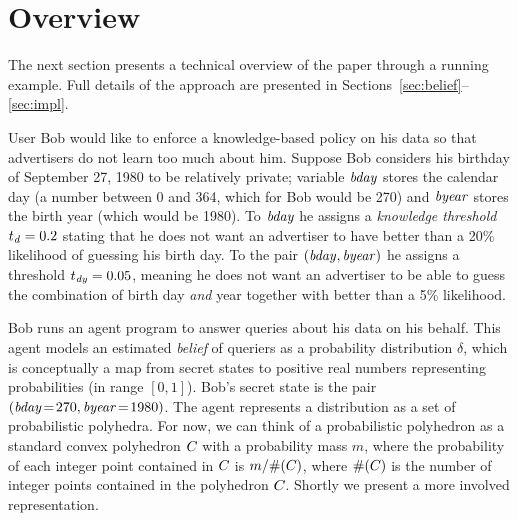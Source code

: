 \section{Overview}
\label{sec:overview}

The next section presents a technical overview of the paper through a
running example.  Full details of the approach are presented in
Sections~\ref{sec:belief}--\ref{sec:impl}. 

  User Bob would
like to enforce a knowledge-based policy on his data so that
advertisers do not learn too much about him.  Suppose Bob considers
his birthday of September 27, 1980 to be relatively private; variable
$\mathit{bday}$ stores the calendar day (a number between 0 and 364,
which for Bob would be 270) and
$\mathit{byear}$ stores the birth year (which would be 1980).  To
$\mathit{bday}$ he assigns a \emph{knowledge threshold} $t_{\mathit{d}} =
0.2$ stating that he does not want an advertiser to have better than a
20\% likelihood of guessing his birth day.  To the pair
$(\mathit{bday},\mathit{byear})$ he assigns a threshold $t_{\mathit{dy}} =
0.05$, meaning he does not want an advertiser to be able to guess the
combination of birth day \emph{and} year together with better than a
5\% likelihood.

Bob runs an agent program to answer queries about his data on his
behalf.  This agent models an estimated \emph{belief} of queriers as a
probability distribution $\delta$, which is conceptually a map from
secret states to positive real numbers representing probabilities (in
range $[0,1]$).  Bob's secret state is the pair $(\mathit{bday}\! =\!
270,\mathit{byear}\! =\! 1980)$.  The agent represents a distribution as a
set of probabilistic polyhedra.  For now, we can think of a
probabilistic polyhedron as a standard convex polyhedron $C_{}$
with a probability mass $m$, where the probability of each integer
point contained in $C_{}$ is $m / \#(C_{})$, where
$\#(C_{})$ is the number of integer points contained in the
polyhedron $C_{}$.  Shortly we present a more involved
representation.

